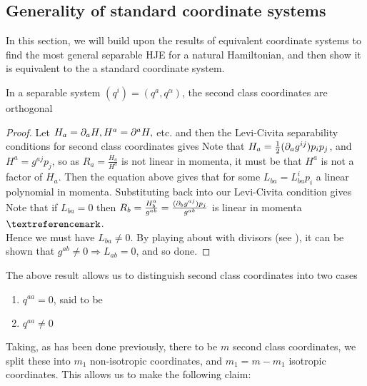 \documentclass{article}
\begin{document}
\subsection{Generality of standard coordinate systems}

In this section, we will build upon the results of equivalent coordinate systems to find the most general separable HJE for a natural Hamiltonian, and then show it is equivalent to the a standard coordinate system.

\begin{prop}
In a separable system $(q^i) = (q^a, q^\alpha)$, the second class coordinates are orthogonal
\end{prop}
\begin{proof}
Let $H_a = \partial_a H, H^a = \partial^a H,$ etc. and then the Levi-Civita separability conditions for second class coordinates gives 
Note that $H_a = \frac{1}{2}(\partial_a g^{ij}) p_i p_j$, and $H^a = g^{aj}p_j$, so as $R_a = \frac{H_a}{H^a}$ is not linear in momenta, it must be that $H^a$ is not a factor of $H_a$. Then the equation above gives that 
for some $L_{ba} = L_{ba}^i p_i$ a linear polynomial in momenta. Substituting back into our Levi-Civita condition gives
Note that if $L_{ba}=0$ then $R_b = \frac{H_b^a}{g^{ab}} = \frac{(\partial_b g^{aj}) p_j}{g^{ab}}$ is linear in momenta $\contradiction$. \\
Hence we must have $L_{ba} \neq 0$. 
By playing about with divisors (see \cite{Benenti1991}), it can be shown that $g^{ab}\neq 0 \Rightarrow L_{ab}=0$, and so done. 
\end{proof}

The above result allows us to distinguish second class coordinates into two cases
\begin{enumerate}
    \item $q^{aa} = 0$, said to be 
    \item $q^{aa} \neq 0$
\end{enumerate}
Taking, as has been done previously, there to be $m$ second class coordinates, we split these into $m_1$ non-isotropic coordinates, and $m_1= m-m_1$ isotropic coordinates. This allows us to make the following claim:
\end{document}
